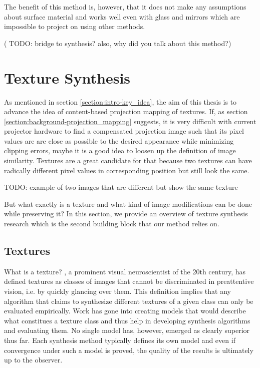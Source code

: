 The benefit of this method is, however, that it does not make any assumptions about surface material and works well even with glass and mirrors which are impossible to project on using other methods.

({\color{red} TODO: bridge to synthesis? also, why did you talk about this method?})

\section{Texture Synthesis}
\label{section:background-texture_synthesis}

As mentioned in section \ref{section:intro-key_idea}, the aim of this thesis is to advance the idea of content-based projection mapping of textures. If, as section \ref{section:background-projection_mapping} suggests, it is very difficult with current projector hardware to find a compensated projection image such that its pixel values are are close as possible to the desired appearance while minimizing clipping errors, maybe it is a good idea to loosen up the definition of image similarity. Textures are a great candidate for that because two textures can have radically different pixel values in corresponding position but still look the same.

{\color{red} TODO: example of two images that are different but show the same texture}

But what exactly is a texture and what kind of image modifications can be done while preserving it? In this section, we provide an overview of texture synthesis research which is the second building block that our method relies on.

\subsection{Textures}
\label{section:background-texture_synthesis-textures}

What is a texture? \citet{Julesz1995}, a prominent visual neuroscientist of the 20th century, has defined textures as classes of images that cannot be discriminated in preattentive vision, i.e. by quickly glancing over them. This definition implies that any algorithm that claims to synthesize different textures of a given class can only be evaluated empirically. Work has gone into creating models that would describe what constitues a texture class and thus help in developing synthesis algorithms and evaluating them. No single model has, however, emerged as clearly superior thus far. Each synthesis method typically defines its own model and even if convergence under such a model is proved, the quality of the results is ultimately up to the observer.


